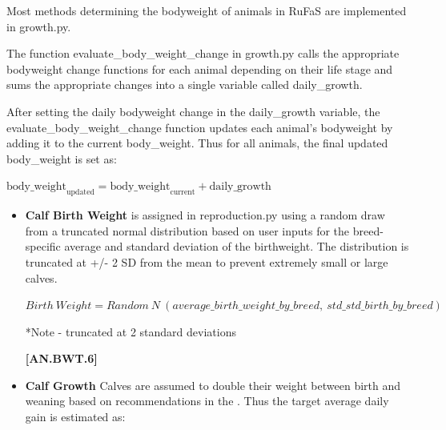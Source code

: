 \begin{refsection}
    Most methods determining the bodyweight of animals in RuFaS are implemented in growth.py. 
    
    The function evaluate\_body\_weight\_change in growth.py calls the appropriate bodyweight change functions for each animal depending on their life stage and sums the appropriate changes into a single variable called daily\_growth. 

    After setting the daily bodyweight change in the daily\_growth variable, the evaluate\_body\_weight\_change function updates each animal's bodyweight by adding it to the current body\_weight. Thus for all animals, the final updated body\_weight is set as:
    \vspace{0.25cm}
    
    \begin{center}
    \(\text{body\_weight}_{\text{updated}} = \text{body\_weight}_{\text{current}} + \text{daily\_growth}\)        
    \end{center}

\begin{itemize}
    \item \textbf{Calf Birth Weight} is assigned in reproduction.py using a random draw from a truncated normal distribution based on user inputs for the breed-specific average and standard deviation of the birthweight. The distribution is truncated at +/- 2 SD from the mean to prevent extremely small or large calves. 
    \vspace{0.5cm}
    
\begin{center}
    \(Birth\ Weight = Random\ N\ (average\_birth\_weight\_by\_breed,\ std\_std\_birth\_by\_breed)\) 
    
    *Note - truncated at 2 standard deviations
\end{center}
    \vspace{0.5cm}
    
    {\raggedleft \textbf{[AN.BWT.6]}\par}
    \vspace{0.5cm}

    \item \textbf{Calf Growth} Calves are assumed to double their weight between birth and weaning based on recommendations in the \cite{nrc2001}. Thus the target average daily gain is estimated as:
    \vspace{0.5cm}

\begin{center}
    

\end{center}
\end{itemize}
\end{refsection}
